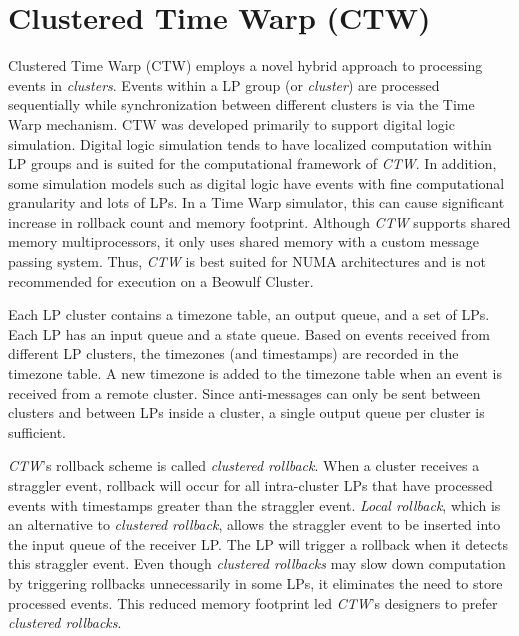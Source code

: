 \documentclass[11pt]{book}
\begin{document}
\section{Clustered Time Warp (CTW)}

Clustered Time Warp \cite{avril-95} (CTW) employs a novel hybrid approach to processing events in
\emph{clusters}.  Events within a LP group (or \emph{cluster}) are processed sequentially while
synchronization between different clusters is via the Time Warp mechanism.  CTW was developed primarily to
support digital logic simulation.  Digital logic simulation tends to have localized computation within LP
groups and is suited for the computational framework of \emph{CTW}\@.  In addition, some simulation models
such as digital logic have events with fine computational granularity and lots of LPs.  In a Time Warp
simulator, this can cause significant increase in rollback count and memory footprint.  Although \emph{CTW}
supports shared memory multiprocessors, it only uses shared memory with a custom message passing system.
Thus, \emph{CTW} is best suited for NUMA architectures and is not recommended for execution on a Beowulf
Cluster.

Each LP cluster contains a timezone table, an output queue, and a set of LPs.  Each LP has an input queue and
a state queue.  Based on events received from different LP clusters, the timezones (and timestamps) are
recorded in the timezone table.  A new timezone is added to the timezone table when an event is received from
a remote cluster.  Since anti-messages can only be sent between clusters and between LPs inside a cluster, a
single output queue per cluster is sufficient.

\emph{CTW}'s rollback scheme is called \emph{clustered rollback}.  When a cluster receives a straggler event,
rollback will occur for all intra-cluster LPs that have processed events with timestamps greater than the
straggler event.  \emph{Local rollback}, which is an alternative to \emph{clustered rollback}, allows the
straggler event to be inserted into the input queue of the receiver LP\@.  The LP will trigger a rollback when
it detects this straggler event.  Even though \emph{clustered rollbacks} may slow down computation by
triggering rollbacks unnecessarily in some LPs, it eliminates the need to store processed events.  This
reduced memory footprint led \emph{CTW}'s designers to prefer \emph{clustered rollbacks}.
\end{document}
